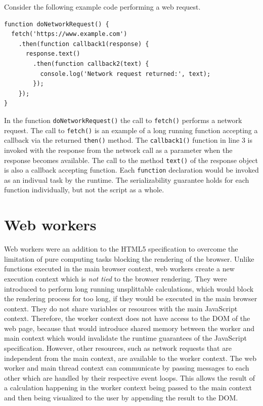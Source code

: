 \documentclass[
	ruledheaders=section,%
	class=report,%
	thesis={type=bachelor},%
	accentcolor=9c,%
	custommargins=true,%
	marginpar=false,%
	parskip=half-,%
	fontsize=11pt,%
]{tudapub}
\begin{document}
  Consider the following example code performing a web request.
\begin{lstlisting}
function doNetworkRequest() {
  fetch('https://www.example.com')
    .then(function callback1(response) {
      response.text()
        .then(function callback2(text) {
          console.log('Network request returned:', text);
        });
    });
}
\end{lstlisting}
  In the function \texttt{doNetworkRequest()} the call to \texttt{fetch()} performs a network request. The call to \texttt{fetch()} is an example of a long running function accepting a callback via the returned \texttt{then()} method. The \texttt{callback1()} function in line 3 is invoked with the response from the network call as a parameter when the response becomes available. The call to the method \texttt{text()} of the response object is also a callback accepting function. Each \texttt{function} declaration would be invoked as an indivual task by the runtime. The serializability guarantee holds for each function individually, but not the script as a whole.
  
  \section{Web workers}

  Web workers were an addition to the HTML5 specification to overcome the limitation of pure computing tasks blocking the rendering of the browser. Unlike functions executed in the main browser context, web workers create a new execution context which is \textit{not tied} to the browser rendering. They were introduced to perform long running unsplittable calculations, which would block the rendering process for too long, if they would be executed in the main browser context. They do not share variables or resources with the main JavaScript context. Therefore, the worker context does not have access to the DOM of the web page, because that would introduce shared memory between the worker and main context which would invalidate the runtime guarantees of the JavaScript specification. However, other resources, such as network requests that are independent from the main context, are available to the worker context. The web worker and main thread context can communicate by passing messages to each other which are handled by their respective event loops. This allows the result of a calculation happening in the worker context being passed to the main context and then being visualized to the user by appending the result to the DOM.
\end{document}
